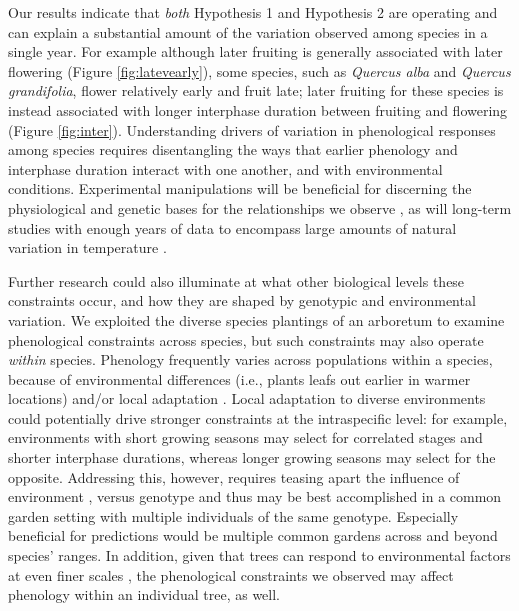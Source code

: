 \documentclass{article}
\begin{document}
\par Our results indicate that \textit{both} Hypothesis 1 and Hypothesis 2 are operating and can explain a substantial amount of the variation observed among species in a single year. For example although later fruiting is generally associated with later flowering (Figure \ref{fig:latevearly}), some species, such as \textit{Quercus alba} and \textit{Quercus grandifolia}, flower relatively early and fruit late; later fruiting for these species is instead associated with longer interphase duration between fruiting and flowering (Figure \ref{fig:inter}). Understanding drivers of variation in phenological responses among species requires disentangling the ways that earlier phenology and interphase duration interact with one another, and with environmental conditions. Experimental manipulations will be beneficial for discerning the physiological and genetic bases for the relationships we observe \citep{flint1974}, as will long-term studies with enough years of data to encompass large amounts of natural variation in temperature \citep[e.g.,][]{inouye2008}.

\par Further research could also illuminate at what other biological levels these constraints occur, and how they are shaped by genotypic and environmental variation. We exploited the diverse species plantings of an arboretum to examine phenological constraints across species, but such constraints may also operate \emph{within} species. Phenology frequently varies across populations within a species, because of environmental differences (i.e., plants leafs out earlier in warmer locations) and/or local adaptation \citep{rathcke1985}. Local adaptation to diverse environments could potentially drive stronger constraints at the intraspecific level: for example, environments with short growing seasons may select for correlated stages and shorter interphase durations, whereas longer growing seasons may select for the opposite. Addressing this, however, requires teasing apart the influence of environment \citep[even to the microclimatic level][]{schwartz2014}, versus genotype and thus may be best accomplished in a common garden setting with multiple individuals of the same genotype. Especially beneficial for predictions would be multiple common gardens across and beyond species' ranges. In addition, given that trees can respond to environmental factors at even finer scales \citep[e.g., the branch level,][]{nakamura2010}, the phenological constraints we observed may affect phenology within an individual tree, as well. 
\end{document}
